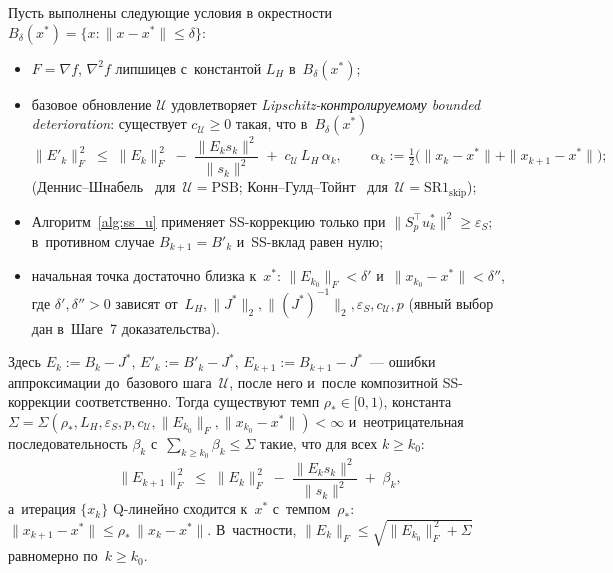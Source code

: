 \begin{lemma}
\label{lem:bd_composite}
Пусть выполнены следующие условия в окрестности $B_\delta(x^*)=\{x:\|x-x^*\|\le\delta\}$:
\begin{itemize}
  \item[\textup{(A1)}] $F=\nabla f$, $\nabla^2 f$ липшицев с~константой $L_H$ в~$B_\delta(x^*)$;
  \item[\textup{(A2)}] базовое обновление $\mathcal{U}$ удовлетворяет
        \emph{Lipschitz-контролируемому bounded deterioration}: существует
        $c_{\mathcal{U}}\ge 0$ такая, что в~$B_\delta(x^*)$
        \begin{equation}\label{eq:bd_base}
          \|E'_k\|_F^{\,2}
          \;\le\; \|E_k\|_F^{\,2}
                 \;-\; \frac{\|E_k s_k\|^2}{\|s_k\|^2}
                 \;+\; c_{\mathcal{U}}\, L_H\, \alpha_k,
          \qquad
          \alpha_k:=\tfrac12\bigl(\|x_k-x^*\|+\|x_{k+1}-x^*\|\bigr);
        \end{equation}
        (Деннис--Шнабель~\cite[Th.~8.2.4]{dennis1996} для~$\mathcal{U}=\mathrm{PSB}$;
         Конн--Гулд--Тойнт~\cite{conn1991} для~$\mathcal{U}=\mathrm{SR1}_{\mathrm{skip}}$);
  \item[\textup{(A3)}] Алгоритм~\ref{alg:ss_u} применяет SS-коррекцию только при
        $\|S_p^{\top} u_k^*\|^2 \ge \varepsilon_S$; в~противном случае
        $B_{k+1}=B'_k$ и~SS-вклад равен нулю;
  \item[\textup{(A4)}] начальная точка достаточно близка к~$x^{*}$:
        $\|E_{k_0}\|_F < \delta'$ и~$\|x_{k_0}-x^{*}\| < \delta''$, где
        $\delta',\delta''>0$ зависят от~$L_H,\|J^{*}\|_2,\|(J^{*})^{-1}\|_2,
        \varepsilon_S,c_{\mathcal{U}},p$ (явный выбор дан в~Шаге~7
        доказательства).
\end{itemize}
Здесь $E_k:=B_k-J^*$, $E'_k:=B'_k-J^*$, $E_{k+1}:=B_{k+1}-J^*$~---
ошибки аппроксимации до~базового шага~$\mathcal{U}$, после него и~после
композитной SS-коррекции соответственно. Тогда существуют темп $\rho_*\in[0,1)$,
константа $\Sigma=\Sigma(\rho_*,L_H,\varepsilon_S,p,c_{\mathcal{U}},
\|E_{k_0}\|_F,\|x_{k_0}-x^*\|)<\infty$ и~неотрицательная последовательность
$\beta_k$ с~$\sum_{k\ge k_0}\beta_k\le\Sigma$ такие, что для всех $k\ge k_0$:
\begin{equation}\label{eq:bd_composite}
  \|E_{k+1}\|_F^{\,2}
  \;\le\; \|E_k\|_F^{\,2}
         \;-\; \frac{\|E_k s_k\|^2}{\|s_k\|^2}
         \;+\; \beta_k,
\end{equation}
а~итерация $\{x_k\}$ Q-линейно сходится к~$x^{*}$ с~темпом~$\rho_*$:
$\|x_{k+1}-x^{*}\|\le\rho_*\,\|x_k-x^{*}\|$. В~частности,
$\|E_k\|_F\le\sqrt{\|E_{k_0}\|_F^{\,2}+\Sigma}$ равномерно по~$k\ge k_0$.
\end{lemma}

